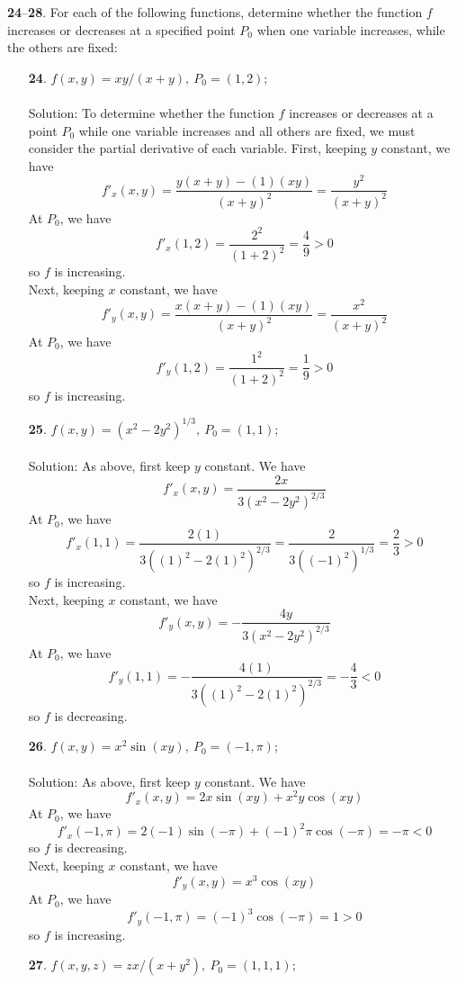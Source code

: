 \documentclass[12pt]{amsbook}
\begin{document}
\noindent
{\small {\bf 24}--{\bf 28}}. For each of the following functions, determine whether the function
$f$ increases or decreases at a specified point $P_0$ when one variable increases,
while the others are fixed:
\begin{enumerate}
\item[{\small\bf 24}.] $f(x,y)=xy/(x+y) , \ P_0=(1,2)$;
\\
\\
{\sc Solution}: To determine whether the function $f$ increases or decreases at a point $P_0$ while one variable increases and all others are fixed, we must consider the partial derivative of each variable. First, keeping $y$ constant, we have
$$f'_x(x,y)=\frac{y(x+y)-(1)(xy)}{(x+y)^2}=\frac{y^2}{(x+y)^2}$$
At $P_0$, we have
$$f'_x(1,2)=\frac{2^2}{(1+2)^2}=\frac{4}{9}>0$$
so $f$ is increasing.
\\
Next, keeping $x$ constant, we have
$$f'_y(x,y)=\frac{x(x+y)-(1)(xy)}{(x+y)^2}=\frac{x^2}{(x+y)^2}$$
At $P_0$, we have
$$f'_y(1,2)=\frac{1^2}{(1+2)^2}=\frac{1}{9}>0$$
so $f$ is increasing.
\\
\item[{\small\bf 25}.] $f(x,y)=(x^2-2y^2)^{1/3} , \ P_0=(1,1)$;
\\
\\
{\sc Solution}: As above, first keep $y$ constant. We have
$$f'_x(x,y)=\frac{2x}{3(x^2-2y^2)^{2/3}}$$
At $P_0$, we have
$$f'_x(1,1)=\frac{2(1)}{3((1)^2-2(1)^2)^{2/3}}=\frac{2}{3((-1)^2)^{1/3}}=\frac{2}{3}>0$$
so $f$ is increasing.
\\
Next, keeping $x$ constant, we have
$$f'_y(x,y)=-\frac{4y}{3(x^2-2y^2)^{2/3}}$$
At $P_0$, we have
$$f'_y(1,1)=-\frac{4(1)}{3((1)^2-2(1)^2)^{2/3}}=-\frac{4}{3}<0$$
so $f$ is decreasing.
\\
\item[{\small\bf 26}.] $f(x,y)=x^2\sin(xy) , \ P_0=(-1,\pi)$;
\\
\\
{\sc Solution}: As above, first keep $y$ constant. We have
$$f'_x(x,y)=2x\sin(xy)+x^2y\cos(xy)$$
At $P_0$, we have
$$f'_x(-1,\pi)=2(-1)\sin(-\pi)+(-1)^2\pi\cos(-\pi)=-\pi<0$$
so $f$ is decreasing.
\\
Next, keeping $x$ constant, we have
$$f'_y(x,y)=x^3\cos(xy)$$
At $P_0$, we have
$$f'_y(-1,\pi)=(-1)^3\cos(-\pi)=1>0$$
so $f$ is increasing.
\\
\item[{\small\bf 27}.] $f(x,y,z)=zx/(x+y^2) , \ P_0=(1,1,1)$;
\\
\\

\end{enumerate}
\end{document}
